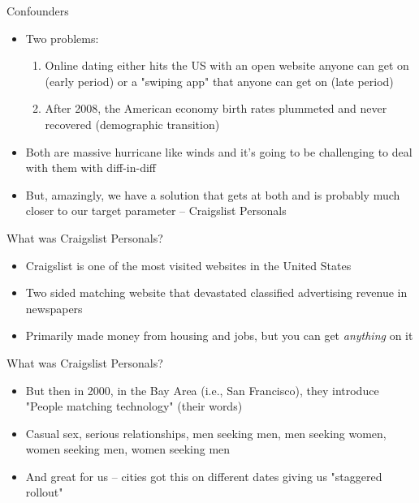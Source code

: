 \documentclass{beamer}
\begin{document}
\begin{frame}{Confounders}

\begin{itemize}

\item Two problems:
	\begin{enumerate}
	\item Online dating either hits the US with an open website anyone can get on (early period) or a "swiping app" that anyone can get on (late period)
	\item After 2008, the American economy birth rates plummeted and never recovered (demographic transition)
	\end{enumerate}
\item Both are massive hurricane like winds and it's going to be challenging to deal with them with diff-in-diff
\item But, amazingly, we have a solution that gets at both and is probably much closer to our target parameter -- Craigslist Personals

\end{itemize}

\end{frame}

\begin{frame}{What was Craigslist Personals?}

\begin{itemize}
\item Craigslist is one of the most visited websites in the United States
\item Two sided matching website that devastated classified advertising revenue in newspapers
\item Primarily made money from housing and jobs, but you can get \emph{anything} on it 
\end{itemize}

\end{frame}

\begin{frame}{What was Craigslist Personals?}

\begin{itemize}
\item But then in 2000, in the Bay Area (i.e., San Francisco), they introduce "People matching technology" (their words) 
\item Casual sex, serious relationships, men seeking men, men seeking women, women seeking men, women seeking men
\item And great for us -- cities got this on different dates giving us "staggered rollout" 
\end{itemize}

\end{frame}
\end{document}
